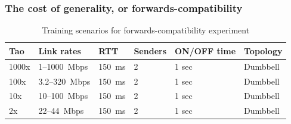 \begin{frame}
\frametitle{The cost of generality, or forwards-compatibility}
\begin{table}
\begin{small}
\begin{tabular}{l|l|l|l|l|l|}
\bf Tao & \bf Link rates & \bf RTT & \bf Senders & ON/OFF time & Topology \\
\hline
1000x  & 1--1000~Mbps & 150~ms & 2  & 1 sec & Dumbbell\\
100x   & 3.2--320~Mbps & 150~ms & 2 & 1 sec & Dumbbell\\
10x    & 10--100~Mbps & 150~ms & 2 & 1 sec & Dumbbell \\
2x     & 22--44~Mbps & 150~ms & 2 & 1 sec & Dumbbell \\
\end{tabular}
\end{small}
\caption{Training scenarios for forwards-compatibility experiment}
\label{table:oprange}
\end{table}
\end{frame}

